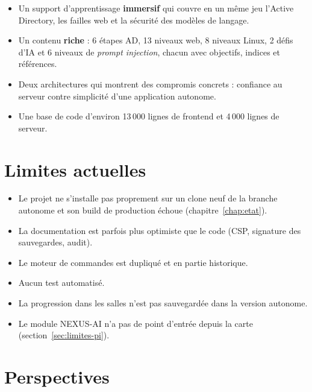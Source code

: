 \documentclass[11pt,a4paper]{report}
\begin{document}
\begin{itemize}
  \item Un support d'apprentissage \textbf{immersif} qui couvre en un m\^eme jeu l'Active
        Directory, les failles web et la s\'ecurit\'e des mod\`eles de langage.
  \item Un contenu \textbf{riche} : 6 \'etapes AD, 13 niveaux web, 8 niveaux Linux,
        2 d\'efis d'IA et 6 niveaux de \emph{prompt injection}, chacun avec objectifs,
        indices et r\'ef\'erences.
  \item Deux architectures qui montrent des compromis concrets : confiance au serveur
        contre simplicit\'e d'une application autonome.
  \item Une base de code d'environ 13\,000 lignes de frontend et 4\,000 lignes de serveur.
\end{itemize}

\section{Limites actuelles}

\begin{itemize}
  \item Le projet ne s'installe pas proprement sur un clone neuf de la branche autonome
        et son build de production \'echoue (chapitre~\ref{chap:etat}).
  \item La documentation est parfois plus optimiste que le code (CSP, signature des
        sauvegardes, audit).
  \item Le moteur de commandes est dupliqu\'e et en partie historique.
  \item Aucun test automatis\'e.
  \item La progression dans les salles n'est pas sauvegard\'ee dans la version autonome.
  \item Le module NEXUS-AI n'a pas de point d'entr\'ee depuis la carte
        (section~\ref{sec:limites-pi}).
\end{itemize}

\section{Perspectives}
\end{document}

